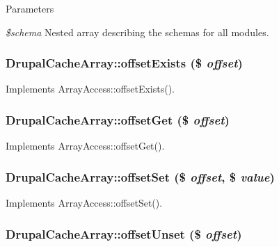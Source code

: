 \begin{DoxyParams}{Parameters}
\item[{\em \$schema}]Nested array describing the schemas for all modules. \end{DoxyParams}
\hypertarget{group__schemaapi_gabec90ca8c02f7c14dfbf66fd9e6bb5dd}{
\subsubsection[{offsetExists}]{\setlength{\rightskip}{0pt plus 5cm}DrupalCacheArray::offsetExists (\$ {\em offset})}}
\label{group__schemaapi_gabec90ca8c02f7c14dfbf66fd9e6bb5dd}
Implements ArrayAccess::offsetExists(). \hypertarget{group__schemaapi_ga57be4d1b39bee68ee1c395c1cd9a2de5}{
\subsubsection[{offsetGet}]{\setlength{\rightskip}{0pt plus 5cm}DrupalCacheArray::offsetGet (\$ {\em offset})}}
\label{group__schemaapi_ga57be4d1b39bee68ee1c395c1cd9a2de5}
Implements ArrayAccess::offsetGet(). \hypertarget{group__schemaapi_ga0d3377e6f4b8c592f006a75f8eadf21a}{
\subsubsection[{offsetSet}]{\setlength{\rightskip}{0pt plus 5cm}DrupalCacheArray::offsetSet (\$ {\em offset}, \/  \$ {\em value})}}
\label{group__schemaapi_ga0d3377e6f4b8c592f006a75f8eadf21a}
Implements ArrayAccess::offsetSet(). \hypertarget{group__schemaapi_ga8bb43551e89c35590c56a49f8fb54e3f}{
\subsubsection[{offsetUnset}]{\setlength{\rightskip}{0pt plus 5cm}DrupalCacheArray::offsetUnset (\$ {\em offset})}}
